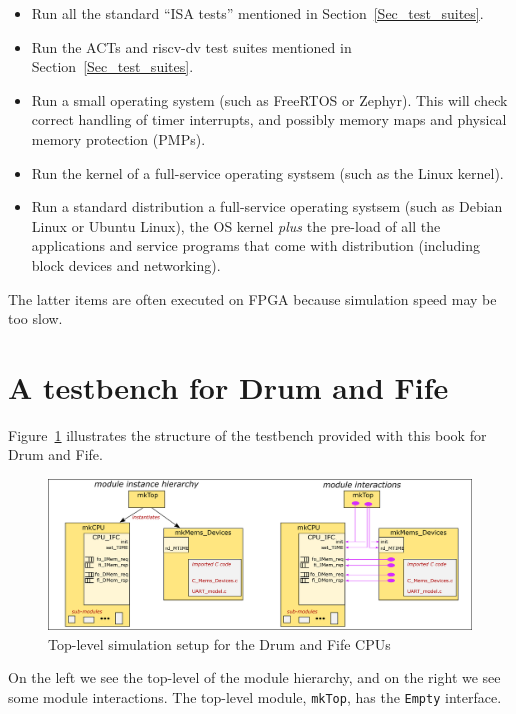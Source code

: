 \begin{itemize}
 \item Run all the standard ``ISA tests'' mentioned in Section~\ref{Sec_test_suites}.

 \item Run the ACTs and riscv-dv test suites mentioned in Section~\ref{Sec_test_suites}.

 \item Run a small operating system (such as FreeRTOS or Zephyr).
       This will check correct handling of timer interrupts, and
       possibly memory maps and physical memory protection (PMPs).

 \item Run the kernel of a full-service operating systsem (such as the Linux kernel).

 \item Run a standard distribution a full-service operating systsem
       (such as Debian Linux or Ubuntu Linux), {\ie} the OS kernel
       \emph{plus} the pre-load of all the applications and service
       programs that come with distribution (including block devices
       and networking).

\end{itemize}

The latter items are often executed on FPGA because simulation speed may be too slow.


\section{A testbench for Drum and Fife}

Figure~\ref{Fig_CPU_Simulation} illustrates the structure of the
testbench provided with this book for Drum and Fife.
\begin{figure}[htbp]
  \centerline{\includegraphics[width=6in,angle=0]{Figures/Fig_CPU_Simulation}}
  \caption{\label{Fig_CPU_Simulation}
           Top-level simulation setup for the Drum and Fife CPUs}
\end{figure}
On the left we see the top-level of the module hierarchy, and on the
right we see some module interactions.  The top-level module,
\verb|mkTop|, has the \verb|Empty| interface.

